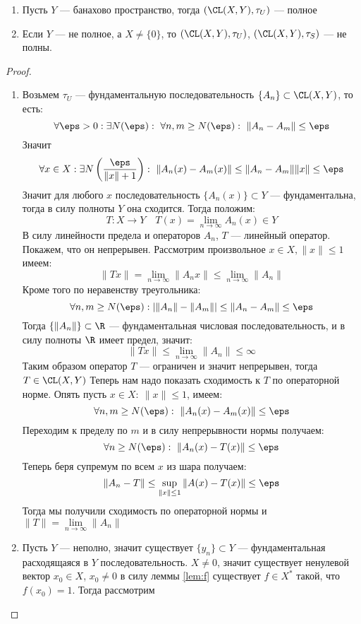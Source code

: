 \begin{theorem}
	\hfill
	\begin{enumerate}
		\item Пусть $Y$ --- банахово пространство, тогда $(\CL(X,Y), \tau_U)$ --- полное
		\item Если $Y$ --- не полное, а $X \neq \{0\}$, то $(\CL(X,Y), \tau_U)$, $(\CL(X,Y), \tau_S)$ --- не полны.
	\end{enumerate}
\end{theorem}
\begin{proof}
	\hfill
	\begin{enumerate}
		\item Возьмем $\tau_U$ --- фундаментальную последовательность $\{A_n\} \subset \CL(X,Y)$, то есть:
		$$
		\forall \eps > 0 : \exists N(\eps): \ \forall n,m \geq N(\eps): \ \|A_n -A_m\| \leq \eps 
		$$
		Значит
		$$
		\forall x \in X: \exists N\left(\frac{\eps}{\|x\| +1}\right) :\ \|A_n(x) - A_m(x)\| \leq \|A_n - A_m\| \|x\| \leq \eps
		$$
		Значит для любого $x$ последовательность $\{A_n(x)\} \subset Y$ --- фундаментальна, тогда в силу полноты $Y$ она сходится.
		Тогда положим:
		$$
		T: X \to Y \quad T(x) = \lim\limits_{n \to \infty} A_n(x) \in Y
		$$
		В силу линейности предела и операторов $A_n$, $T$ --- линейный оператор. Покажем, что он непрерывен. Рассмотрим произвольное $x \in X, \|x\| \leq 1$ имеем:
		$$
		\|Tx\| = \lim\limits_{n \to \infty}{\|A_n x\|} \leq \lim\limits_{n \to \infty}\|A_n\|
		$$
		Кроме того по неравенству треугольника: 
		$$
		 \forall n,m \geq N(\eps): \left|\|A_n\| - \|A_m\|\right| \leq \|A_n - A_m\| \leq \eps
		$$
		Тогда $\{\|A_n\|\} \subset \R$ --- фундаментальная числовая последовательность, и в силу полноты $\R$ имеет предел, значит: 
		$$
		\|Tx\| \leq \lim\limits_{n \to \infty} \|A_n\| \leq \infty
		$$
		Таким образом оператор $T$ --- ограничен и значит непрерывен, тогда $T \in \CL(X, Y)$
		Теперь нам надо показать сходимость к $T$ по операторной норме. Опять пусть $x \in X: \ \|x\| \leq 1$, имеем:
		$$
		\forall n, m \geq N(\eps): \ \|A_n(x) - A_m(x)\| \leq \eps
		$$
		Переходим к пределу по $m$ и в силу непрерывности нормы получаем:
		$$
		\forall n \geq N(\eps): \ \|A_n(x) - T(x)\| \leq \eps 
		$$
		Теперь беря супремум по всем $x$ из шара получаем:
		$$
		\|A_n - T\|  \leq \sup\limits_{\|x\| \leq 1}\|A(x) - T(x)\| \leq \eps
		$$
		Тогда мы получили сходимость по операторной нормы и $\|T\| = \lim\limits_{n \to \infty}\|A_n\|$
		\item Пусть $Y$ --- неполно, значит существует $\{y_n\} \subset Y$ --- фундаментальная расходящаяся в $Y$ последовательность. $X \neq 0$, значит существует ненулевой вектор $x_0 \in X$, $x_0 \neq 0$ в силу леммы \ref{lem:f} существует $f\in X^*$ такой, что $f(x_0) = 1$. Тогда рассмотрим

\end{enumerate}
\end{proof}
